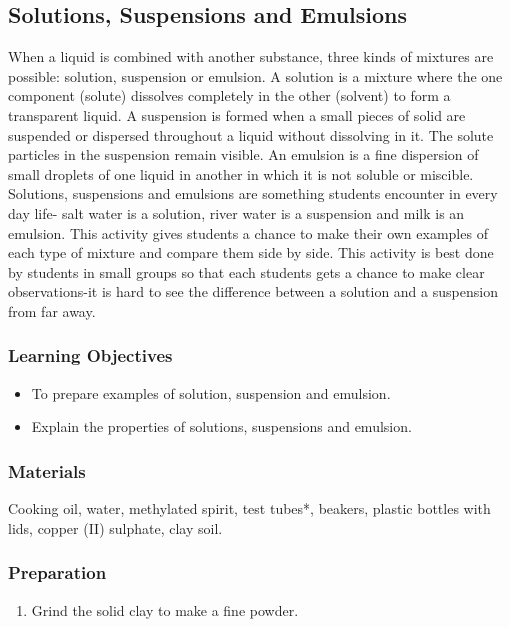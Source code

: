 \subsection{Solutions, Suspensions and Emulsions}
When a liquid is combined with another substance, three kinds of mixtures are possible: solution, suspension or emulsion. 
A solution is a mixture where the one component (solute) dissolves completely in the other (solvent) to form a transparent liquid. A suspension is formed when a small pieces of solid are suspended or dispersed throughout a liquid without dissolving in it. The solute particles in the suspension remain visible.  An emulsion is a fine dispersion of small droplets of one liquid in another in which it is not soluble or miscible. 
Solutions, suspensions and emulsions are something students encounter in every day life- salt water is a solution, river water is a suspension and milk is an emulsion.
This activity gives students a chance to make their own examples of each type of mixture and compare them side by side. This activity is best done by students in small groups so that each students gets a chance to make clear observations-it is hard to see the difference between a solution and a suspension from far away.

\subsubsection*{Learning Objectives}
\begin{itemize}
\item{To prepare examples of solution, suspension and emulsion.}
\item{Explain the properties of solutions, suspensions and emulsion.}
\end{itemize}

\subsubsection*{Materials}
Cooking oil, water, methylated spirit, test tubes*, beakers, plastic bottles with lids, copper (II) sulphate, clay soil.

\subsubsection*{Preparation}
\begin{enumerate}
\item{Grind the solid clay to make a fine powder.}
\end{enumerate}

